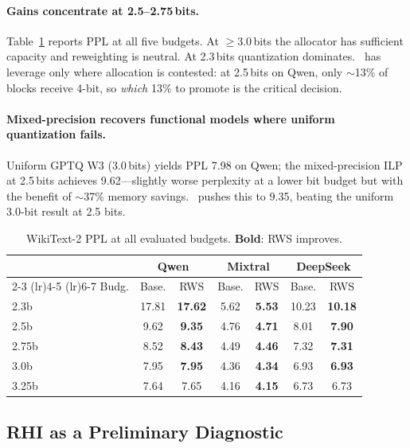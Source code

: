 \paragraph{Gains concentrate at 2.5--2.75\,bits.}
Table~\ref{tab:ppl_all} reports PPL at all five budgets. At $\ge\!3.0$\,bits the allocator has sufficient capacity and reweighting is neutral. At 2.3\,bits quantization dominates. \method\ has leverage only where allocation is contested: at 2.5\,bits on Qwen, only ${\sim}$13\% of blocks receive 4-bit, so \emph{which} 13\% to promote is the critical decision.

\paragraph{Mixed-precision recovers functional models where uniform quantization fails.}
Uniform GPTQ W3 (3.0\,bits) yields PPL 7.98 on Qwen; the mixed-precision ILP at 2.5\,bits achieves 9.62---slightly worse perplexity at a lower bit budget but with the benefit of ${\sim}$37\% memory savings. \method\ pushes this to 9.35, beating the uniform 3.0-bit result at 2.5 bits.

\begin{table}[t]
\centering
\small
\caption{WikiText-2 PPL at all evaluated budgets. \textbf{Bold}: RWS improves.}
\label{tab:ppl_all}
\setlength{\tabcolsep}{2.5pt}
\begin{tabular}{lcccccc}
\toprule
& \multicolumn{2}{c}{Qwen} & \multicolumn{2}{c}{Mixtral} & \multicolumn{2}{c}{DeepSeek} \\
\cmidrule(lr){2-3} \cmidrule(lr){4-5} \cmidrule(lr){6-7}
Budg. & Base. & RWS & Base. & RWS & Base. & RWS \\
\midrule
2.3b  & 17.81 & \textbf{17.62} & 5.62  & \textbf{5.53}  & 10.23 & \textbf{10.18} \\
2.5b  & 9.62  & \textbf{9.35}  & 4.76  & \textbf{4.71}  & 8.01  & \textbf{7.90} \\
2.75b & 8.52  & \textbf{8.43}  & 4.49  & \textbf{4.46}  & 7.32  & \textbf{7.31} \\
3.0b  & 7.95  & \textbf{7.95}  & 4.36  & \textbf{4.34}  & 6.93  & \textbf{6.93} \\
3.25b & 7.64  & 7.65           & 4.16  & \textbf{4.15}  & 6.73  & 6.73 \\
\bottomrule
\end{tabular}
\end{table}

\subsection{RHI as a Preliminary Diagnostic}
\label{sec:rhi-validation}

